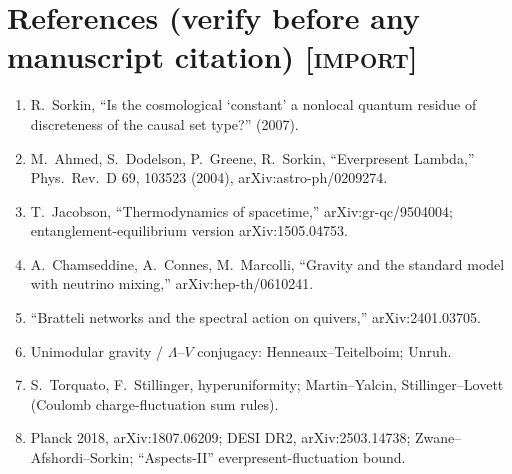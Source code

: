 \documentclass[11pt]{article}
\newcommand{\Lam}{\Lambda}
\newcommand{\Import}{\textcolor{icol}{\textsc{[import]}}} %
\begin{document}
\section*{References (verify before any manuscript citation) \Import}
\begin{enumerate}[leftmargin=1.6em,itemsep=0pt]
\item R.~Sorkin, ``Is the cosmological `constant' a nonlocal quantum residue of
  discreteness of the causal set type?'' (2007).
\item M.~Ahmed, S.~Dodelson, P.~Greene, R.~Sorkin, ``Everpresent Lambda,''
  Phys.\ Rev.\ D 69, 103523 (2004), arXiv:astro-ph/0209274.
\item T.~Jacobson, ``Thermodynamics of spacetime,'' arXiv:gr-qc/9504004;
  entanglement-equilibrium version arXiv:1505.04753.
\item A.~Chamseddine, A.~Connes, M.~Marcolli, ``Gravity and the standard model
  with neutrino mixing,'' arXiv:hep-th/0610241.
\item ``Bratteli networks and the spectral action on quivers,'' arXiv:2401.03705.
\item Unimodular gravity / $\Lam$--$V$ conjugacy: Henneaux--Teitelboim; Unruh.
\item S.~Torquato, F.~Stillinger, hyperuniformity; Martin--Yalcin,
  Stillinger--Lovett (Coulomb charge-fluctuation sum rules).
\item Planck 2018, arXiv:1807.06209; DESI DR2, arXiv:2503.14738;
  Zwane--Afshordi--Sorkin; ``Aspects-II'' everpresent-fluctuation bound.
\end{enumerate}
\end{document}

